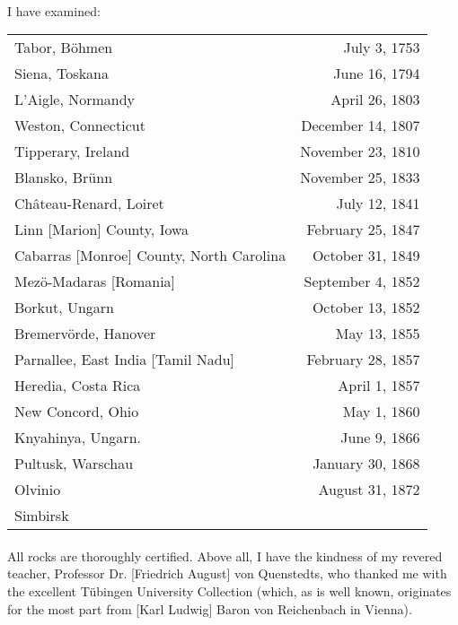 \documentclass[a4paper, 12pt, oneside]{article}
\begin{document}
\paragraph{}
I have examined:
\begin{center}
\begin{tabular}{ l r }
 Tabor, Böhmen & July 3, 1753 \\
 Siena, Toskana & June 16, 1794 \\
 L'Aigle, Normandy & April 26, 1803 \\
 Weston, Connecticut & December 14, 1807 \\
 Tipperary, Ireland & November 23, 1810 \\
 Blansko, Brünn & November 25, 1833 \\
 Château-Renard, Loiret & July 12, 1841 \\
 Linn [Marion] County, Iowa & February 25, 1847 \\
 Cabarras [Monroe] County, North Carolina & October 31, 1849 \\
 Mezö-Madaras [Romania] & September 4, 1852 \\
 Borkut, Ungarn & October 13, 1852 \\
 Bremervörde, Hanover & May 13, 1855 \\
 Parnallee, East India [Tamil Nadu] & February 28, 1857 \\
 Heredia, Costa Rica & April 1, 1857 \\
 New Concord, Ohio & May 1, 1860 \\
 Knyahinya, Ungarn. & June 9, 1866 \\
 Pultusk, Warschau & January 30, 1868 \\
 Olvinio & August 31, 1872 \\
 Simbirsk & \\
\end{tabular}
\end{center}
\clearpage
\paragraph{}
\begin{sloppypar}
All rocks are thoroughly certified. Above all, I have the kindness of my revered teacher, Professor Dr. [Friedrich August] von Quenstedts, who thanked me with the excellent Tübingen University Collection (which, as is well known, originates for the most part from [Karl Ludwig] Baron von Reichenbach in Vienna).
\end{sloppypar}
\end{document}
